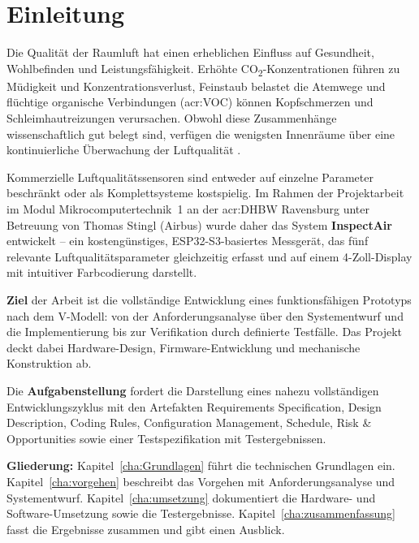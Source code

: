 \chapter{Einleitung}
\label{cha:Einleitung}

Die Qualität der Raumluft hat einen erheblichen Einfluss auf Gesundheit, Wohlbefinden und Leistungsfähigkeit. Erhöhte CO\textsubscript{2}-Konzentrationen führen zu Müdigkeit und Konzentrationsverlust, Feinstaub belastet die Atemwege und flüchtige organische Verbindungen (\acrshort{acr:VOC}) können Kopfschmerzen und Schleimhautreizungen verursachen. Obwohl diese Zusammenhänge wissenschaftlich gut belegt sind, verfügen die wenigsten Innenräume über eine kontinuierliche Überwachung der Luftqualität \autocite{WHO.2021}.

Kommerzielle Luftqualitätssensoren sind entweder auf einzelne Parameter beschränkt oder als Komplettsysteme kostspielig. Im Rahmen der Projektarbeit im Modul Mikrocomputertechnik~1 an der \acrshort{acr:DHBW} Ravensburg unter Betreuung von Thomas Stingl (Airbus) wurde daher das System \textbf{InspectAir} entwickelt -- ein kostengünstiges, ESP32-S3-basiertes Messgerät, das fünf relevante Luftqualitätsparameter gleichzeitig erfasst und auf einem 4-Zoll-Display mit intuitiver Farbcodierung darstellt.

\textbf{Ziel} der Arbeit ist die vollständige Entwicklung eines funktionsfähigen Prototyps nach dem V-Modell: von der Anforderungsanalyse über den Systementwurf und die Implementierung bis zur Verifikation durch definierte Testfälle. Das Projekt deckt dabei Hardware-Design, Firmware-Entwicklung und mechanische Konstruktion ab.

Die \textbf{Aufgabenstellung} fordert die Darstellung eines nahezu vollständigen Entwicklungszyklus mit den Artefakten Requirements Specification, Design Description, Coding Rules, Configuration Management, Schedule, Risk \& Opportunities sowie einer Testspezifikation mit Testergebnissen.

\textbf{Gliederung:} Kapitel~\ref{cha:Grundlagen} führt die technischen Grundlagen ein. Kapitel~\ref{cha:vorgehen} beschreibt das Vorgehen mit Anforderungsanalyse und Systementwurf. Kapitel~\ref{cha:umsetzung} dokumentiert die Hardware- und Software-Umsetzung sowie die Testergebnisse. Kapitel~\ref{cha:zusammenfassung} fasst die Ergebnisse zusammen und gibt einen Ausblick.
